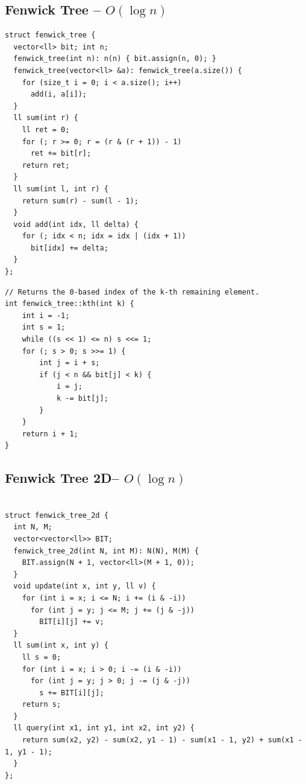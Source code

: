 \documentclass[10pt,a4paper,twocolumn]{article}
\begin{document}
    \subsection{Fenwick Tree -- $O(\log n)$}
    
	\begin{lstlisting}[style=cpp, title={fenwick$\_$tree.cpp}]
struct fenwick_tree {
  vector<ll> bit; int n;
  fenwick_tree(int n): n(n) { bit.assign(n, 0); }
  fenwick_tree(vector<ll> &a): fenwick_tree(a.size()) {
    for (size_t i = 0; i < a.size(); i++)
      add(i, a[i]);
  }
  ll sum(int r) {
    ll ret = 0;
    for (; r >= 0; r = (r & (r + 1)) - 1)
      ret += bit[r];
    return ret;
  }
  ll sum(int l, int r) {
    return sum(r) - sum(l - 1);
  }
  void add(int idx, ll delta) {
    for (; idx < n; idx = idx | (idx + 1))
      bit[idx] += delta;
  }
};
    \end{lstlisting}

	\begin{lstlisting}[style=cpp, title={kth$\_$fenwick.cpp}]
// Returns the 0-based index of the k-th remaining element.
int fenwick_tree::kth(int k) {
    int i = -1;
    int s = 1;
    while ((s << 1) <= n) s <<= 1;
    for (; s > 0; s >>= 1) {
        int j = i + s;
        if (j < n && bit[j] < k) {
            i = j;
            k -= bit[j];
        }
    }
    return i + 1;
}
    \end{lstlisting}

    \subsection{Fenwick Tree 2D-- $O(\log n)$}
    
	\begin{lstlisting}[style=cpp, title={fenwick$\_$tree$\_$2d.cpp}]

struct fenwick_tree_2d {
  int N, M;
  vector<vector<ll>> BIT;
  fenwick_tree_2d(int N, int M): N(N), M(M) {
    BIT.assign(N + 1, vector<ll>(M + 1, 0));
  }
  void update(int x, int y, ll v) {
    for (int i = x; i <= N; i += (i & -i))
      for (int j = y; j <= M; j += (j & -j))
        BIT[i][j] += v;
  }
  ll sum(int x, int y) {
    ll s = 0;
    for (int i = x; i > 0; i -= (i & -i))
      for (int j = y; j > 0; j -= (j & -j))
        s += BIT[i][j];
    return s;
  }
  ll query(int x1, int y1, int x2, int y2) {
    return sum(x2, y2) - sum(x2, y1 - 1) - sum(x1 - 1, y2) + sum(x1 - 1, y1 - 1);
  }
};

    \end{lstlisting}
\end{document}
